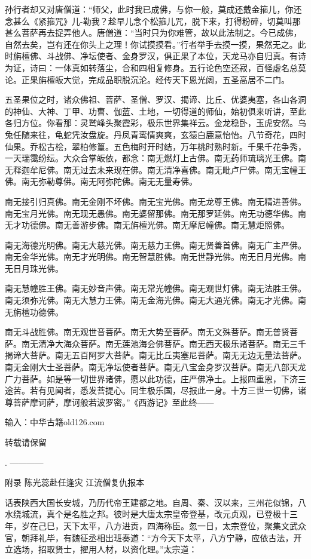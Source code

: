 \documentclass[12pt,UTF8]{ctexbook}
\begin{document}
{	孙行者却又对唐僧道：“师父，此时我已成佛，与你一般，莫成还戴金箍儿，你还念甚么《紧箍咒》儿-勒我？趁早儿念个松箍儿咒，脱下来，打得粉碎，切莫叫那甚么菩萨再去捉弄他人。唐僧道：“当时只为你难管，故以此法制之。今已成佛，自然去矣，岂有还在你头上之理！你试摸摸看。”行者举手去摸一摸，果然无之。此时旃檀佛、斗战佛、净坛使者、金身罗汉，俱正果了本位，天龙马亦自归真。有诗为证，诗曰：一体真如转落尘，合和四相复修身。五行论色空还寂，百怪虚名总莫论。正果旃檀皈大觉，完成品职脱沉沦。经传天下恩光阔，五圣高居不二门。
	
	五圣果位之时，诸众佛祖、菩萨、圣僧、罗汉、揭谛、比丘、优婆夷塞，各山各洞的神仙、大神、丁甲、功曹、伽蓝、土地，一切得道的师仙，始初俱来听讲，至此各归方位。你看那：灵鹫峰头聚霞彩，极乐世界集祥云。金龙稳卧，玉虎安然。乌兔任随来往，龟蛇凭汝盘旋。丹凤青鸾情爽爽，玄猿白鹿意怡怡。八节奇花，四时仙果。乔松古桧，翠柏修篁。五色梅时开时结，万年桃时熟时新。千果千花争秀，一天瑞霭纷纭。大众合掌皈依，都念：南无燃灯上古佛。南无药师琉璃光王佛。南无释迦牟尼佛。南无过去未来现在佛。南无清净喜佛。南无毗卢尸佛。南无宝幢王佛。南无弥勒尊佛。南无阿弥陀佛。南无无量寿佛。
	
	南无接引归真佛。南无金刚不坏佛。南无宝光佛。南无龙尊王佛。南无精进善佛。南无宝月光佛。南无现无愚佛。南无婆留那佛。南无那罗延佛。南无功德华佛。南无才功德佛。南无善游步佛。南无旃檀光佛。南无摩尼幢佛。南无慧炬照佛。
	
	南无海德光明佛。南无大慈光佛。南无慈力王佛。南无贤善首佛。南无广主严佛。南无金华光佛。南无才光明佛。南无智慧胜佛。南无世静光佛。南无日月光佛。南无日月珠光佛。
	
	南无慧幢胜王佛。南无妙音声佛。南无常光幢佛。南无观世灯佛。南无法胜王佛。南无须弥光佛。南无大慧力王佛。南无金海光佛。南无大通光佛。南无才光佛。南无旃檀功德佛。
	
	南无斗战胜佛。南无观世音菩萨。南无大势至菩萨。南无文殊菩萨。南无普贤菩萨。南无清净大海众菩萨。南无莲池海会佛菩萨。南无西天极乐诸菩萨。南无三千揭谛大菩萨。南无五百阿罗大菩萨。南无比丘夷塞尼菩萨。南无无边无量法菩萨。南无金刚大士圣菩萨。南无净坛使者菩萨。南无八宝金身罗汉菩萨。南无八部天龙广力菩萨。如是等一切世界诸佛，愿以此功德，庄严佛净土。上报四重恩，下济三途苦。若有见闻者，悉发菩提心。同生极乐国，尽报此一身。十方三世一切佛，诸尊菩萨摩诃萨，摩诃般若波罗密。”《西游记》至此终——
	
	输入：中华古籍old126.com
	
	转载请保留
	
	.
	------------
	
	附录 陈光蕊赴任逢灾 江流僧复仇报本
	
	话表陕西大国长安城，乃历代帝王建都之地。自周、秦、汉以来，三州花似锦，八水绕城流，真个是名胜之邦。彼时是大唐太宗皇帝登基，改元贞观，已登极十三年，岁在己巳，天下太平，八方进贡，四海称臣。忽一日，太宗登位，聚集文武众官，朝拜礼毕，有魏征丞相出班奏道：“方今天下太平，八方宁静，应依古法，开立选场，招取贤士，擢用人材，以资化理。”太宗道：
	
}
\end{document}
